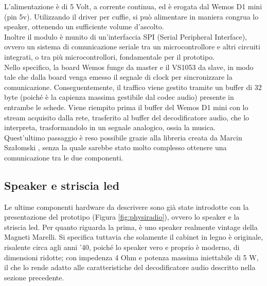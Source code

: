 \documentclass[12pt,a4paper]{report}
\begin{document}
L'alimentazione è di 5 Volt, a corrente continua, ed è erogata dal Wemos D1 mini (pin 5v). 
Utilizzando il driver per cuffie, si può alimentare in maniera congrua lo speaker, ottenendo un sufficiente volume d'ascolto.\\ %
Inoltre il modulo è munito di un'interfaccia SPI (Serial Peripheral Interface), ovvero un sistema di comunicazione seriale tra un microcontrollore e altri circuiti integrati, o tra più microcontrollori, fondamentale per il prototipo. \\
Nello specifico, la board Wemos funge da master e il VS1053 da slave, in modo tale che dalla board venga emesso il segnale di clock per sincronizzare la comunicazione. Conseguentemente, il traffico viene gestito tramite un buffer di 32 byte (poiché è la capienza massima gestibile dal codec audio) presente in entrambe le schede. Viene riempito prima il buffer del Wemos D1 mini con lo stream acquisito dalla rete, trasferito al buffer del decodificatore audio, che lo interpreta, trasformandolo in un segnale analogico, ossia la musica.\\
Quest'ultimo passaggio è reso possibile grazie alla libreria creata da Marcin Szałomski \cite{vs1053baldram}, senza la quale sarebbe stato molto complesso ottenere una comunicazione tra le due componenti.

\subsection{Speaker e striscia led}
Le ultime componenti hardware da descrivere sono già state introdotte con la presentazione del prototipo (Figura \ref{fig:physiradio}), ovvero lo speaker e la striscia led.
Per quanto riguarda la prima, è uno speaker realmente vintage della Magneti Marelli. Si specifica tuttavia che solamente il cabinet in legno è originale, risalente circa agli anni '40, poiché lo speaker vero e proprio è moderno, di dimensioni ridotte; con impedenza 4 Ohm e potenza massima iniettabile di 5 W, il che lo rende adatto alle caratteristiche del decodificatore audio descritto nella sezione precedente.\\
\end{document}
